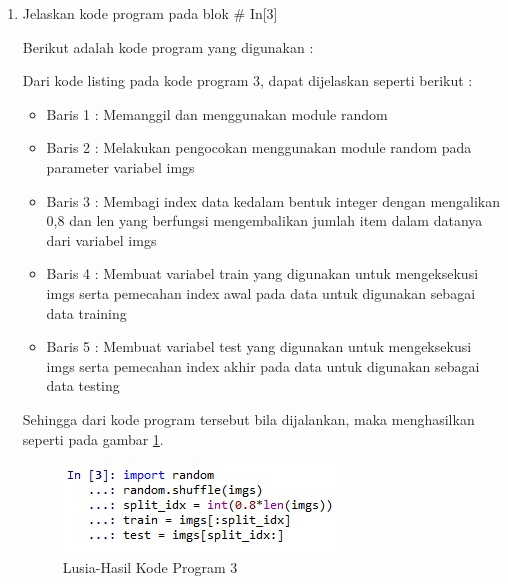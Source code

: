 \begin{enumerate}
\item Jelaskan kode program pada blok \# In[3]
	\par Berikut adalah kode program yang digunakan :
	
	\par Dari kode listing pada kode program 3, dapat dijelaskan seperti berikut :
	\begin{itemize}
	\item Baris 1	: Memanggil dan menggunakan module random
	\item Baris 2	: Melakukan pengocokan menggunakan module random pada parameter variabel imgs
	\item Baris 3	: Membagi index data kedalam bentuk integer dengan mengalikan 0,8 dan len yang berfungsi mengembalikan jumlah item dalam datanya dari variabel imgs
	\item Baris 4	: Membuat variabel train yang digunakan untuk mengeksekusi imgs serta pemecahan index awal pada data untuk digunakan sebagai data training
	\item Baris 5	: Membuat variabel test yang digunakan untuk mengeksekusi imgs serta pemecahan index akhir pada data untuk digunakan sebagai data testing
	\end{itemize}
	\par Sehingga dari kode program tersebut bila dijalankan, maka menghasilkan seperti pada gambar \ref{7B3}.
		\begin{figure}[!hbtp]
		\centering
		\includegraphics[scale=0.5]{figures/w3.jpg}
		\caption{Lusia-Hasil Kode Program 3}
		\label{7B3}
		\end{figure}
	

\end{enumerate}
